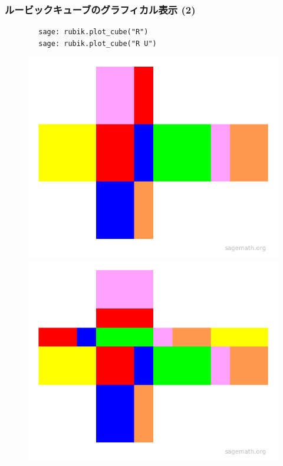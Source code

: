 \documentclass{beamer}
\begin{document}
\begin{frame}[fragile=singleslide]
    \frametitle{ルービックキューブのグラフィカル表示 (2)}

    \begin{verbatim}
        sage: rubik.plot_cube("R")
        sage: rubik.plot_cube("R U")
    \end{verbatim}

    \begin{figure}
        \includegraphics[scale=0.35]{images/plot_cube_R.png}
        \includegraphics[scale=0.35]{images/plot_cube_RU.png}
    \end{figure}
\end{frame}
\end{document}
